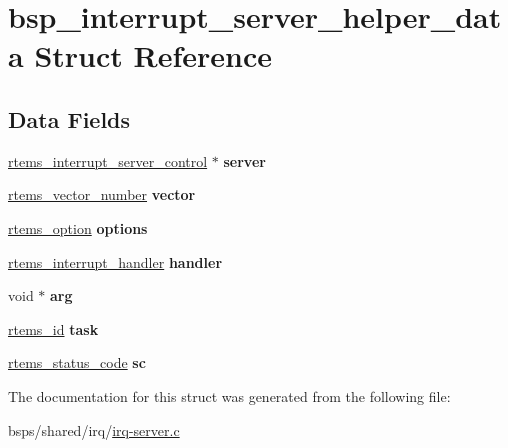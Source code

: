\hypertarget{structbsp__interrupt__server__helper__data}{}\section{bsp\+\_\+interrupt\+\_\+server\+\_\+helper\+\_\+data Struct Reference}
\label{structbsp__interrupt__server__helper__data}
\subsection*{Data Fields}
\begin{DoxyCompactItemize}
\item 
\mbox{\label{structbsp__interrupt__server__helper__data_a73d346ddd163ad8e8da6eff422b76373}} 
\mbox{\hyperlink{structrtems__interrupt__server__control}{rtems\+\_\+interrupt\+\_\+server\+\_\+control}} $\ast$ {\bfseries server}
\item 
\mbox{\label{structbsp__interrupt__server__helper__data_afb6fc1154163fdf92a58c773c2e88229}} 
\mbox{\hyperlink{group__ClassicINTR_ga3e434c197d99f128e78cae4d9358bd8b}{rtems\+\_\+vector\+\_\+number}} {\bfseries vector}
\item 
\mbox{\label{structbsp__interrupt__server__helper__data_ab1f76bc6c9206378f400362c210141db}} 
\mbox{\hyperlink{group__ClassicOptions_gad26685eb0e60a9650082935c31920e29}{rtems\+\_\+option}} {\bfseries options}
\item 
\mbox{\label{structbsp__interrupt__server__helper__data_ae95815a8cf0f6dffcbe9f22bd0bb4618}} 
\mbox{\hyperlink{group__rtems__interrupt__extension_gab39bd096ab2c3b41d03dace0e9777b08}{rtems\+\_\+interrupt\+\_\+handler}} {\bfseries handler}
\item 
\mbox{\label{structbsp__interrupt__server__helper__data_a366c0266805af6ae45a29c2f85cf2036}} 
void $\ast$ {\bfseries arg}
\item 
\mbox{\label{structbsp__interrupt__server__helper__data_ac4738fb2d5c36843e077f71d0a712a45}} 
\mbox{\hyperlink{group__ClassicTasks_gab20892b814dced7dd4e5b9bf42becd57}{rtems\+\_\+id}} {\bfseries task}
\item 
\mbox{\label{structbsp__interrupt__server__helper__data_a8e43f0a2ce17c01897b644f6e4869f5e}} 
\mbox{\hyperlink{group__ClassicStatus_ga545d41846817eaba6143d52ee4d9e9fe}{rtems\+\_\+status\+\_\+code}} {\bfseries sc}
\end{DoxyCompactItemize}


The documentation for this struct was generated from the following file\+:\begin{DoxyCompactItemize}
\item 
bsps/shared/irq/\mbox{\hyperlink{irq-server_8c}{irq-\/server.\+c}}\end{DoxyCompactItemize}
